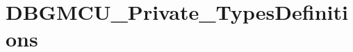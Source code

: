 \hypertarget{group___d_b_g_m_c_u___private___types_definitions}{\section{D\-B\-G\-M\-C\-U\-\_\-\-Private\-\_\-\-Types\-Definitions}
\label{group___d_b_g_m_c_u___private___types_definitions}
}
